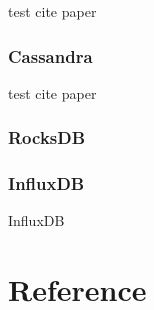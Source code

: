 \documentclass[12pt,a4paper,oneside]{book}
\begin{document}
test cite paper\cite{bigtable}

\subsection{Cassandra}

test cite paper\cite{cassandra}

\subsection{RocksDB}

\subsection{InfluxDB}

InfluxDB

\clearpage

\chapter*{Reference}
\printbibliography
\end{document}
